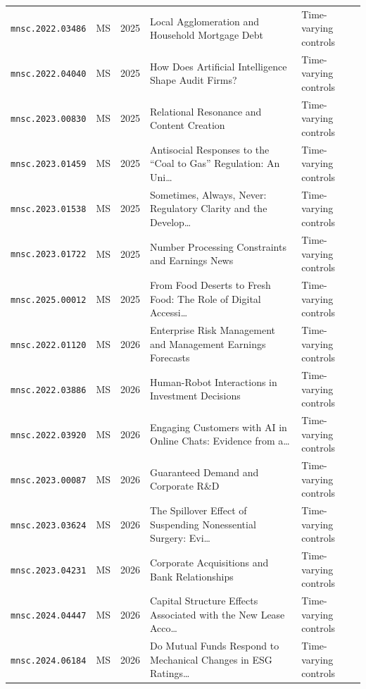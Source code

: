\begin{longtable}{lccp{}l}
\texttt{mnsc.2022.03486} & MS & 2025 & \raggedright Local Agglomeration and Household Mortgage Debt & Time-varying controls \\
\texttt{mnsc.2022.04040} & MS & 2025 & \raggedright How Does Artificial Intelligence Shape Audit Firms? & Time-varying controls \\
\texttt{mnsc.2023.00830} & MS & 2025 & \raggedright Relational Resonance and Content Creation & Time-varying controls \\
\texttt{mnsc.2023.01459} & MS & 2025 & \raggedright Antisocial Responses to the ``Coal to Gas'' Regulation: An Uni\ldots{} & Time-varying controls \\
\texttt{mnsc.2023.01538} & MS & 2025 & \raggedright Sometimes, Always, Never: Regulatory Clarity and the Develop\ldots{} & Time-varying controls \\
\texttt{mnsc.2023.01722} & MS & 2025 & \raggedright Number Processing Constraints and Earnings News & Time-varying controls \\
\texttt{mnsc.2025.00012} & MS & 2025 & \raggedright From Food Deserts to Fresh Food: The Role of Digital Accessi\ldots{} & Time-varying controls \\
\texttt{mnsc.2022.01120} & MS & 2026 & \raggedright Enterprise Risk Management and Management Earnings Forecasts & Time-varying controls \\
\texttt{mnsc.2022.03886} & MS & 2026 & \raggedright Human-Robot Interactions in Investment Decisions & Time-varying controls \\
\texttt{mnsc.2022.03920} & MS & 2026 & \raggedright Engaging Customers with AI in Online Chats: Evidence from a\ldots{} & Time-varying controls \\
\texttt{mnsc.2023.00087} & MS & 2026 & \raggedright Guaranteed Demand and Corporate R\&D & Time-varying controls \\
\texttt{mnsc.2023.03624} & MS & 2026 & \raggedright The Spillover Effect of Suspending Nonessential Surgery: Evi\ldots{} & Time-varying controls \\
\texttt{mnsc.2023.04231} & MS & 2026 & \raggedright Corporate Acquisitions and Bank Relationships & Time-varying controls \\
\texttt{mnsc.2024.04447} & MS & 2026 & \raggedright Capital Structure Effects Associated with the New Lease Acco\ldots{} & Time-varying controls \\
\texttt{mnsc.2024.06184} & MS & 2026 & \raggedright Do Mutual Funds Respond to Mechanical Changes in ESG Ratings\ldots{} & Time-varying controls \\

\end{longtable}
